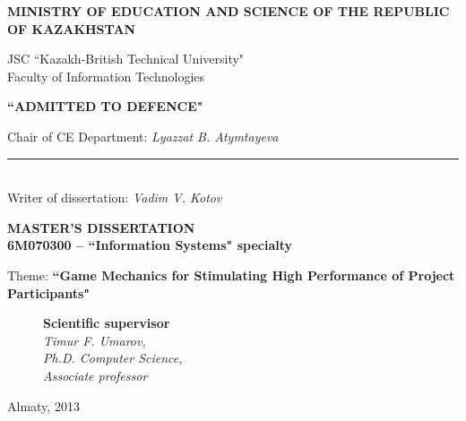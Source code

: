 \begin{titlepage}
	\pagestyle{empty}
	\begin{center}
		{\bf{\MakeUppercase{Ministry of education and science of the republic of Kazakhstan}}

		\vspace{14pt}

		JSC ``Kazakh-British Technical University"\\
		Faculty of Information Technologies}
       
       \vspace{14pt}
       
		\begin{flushright}
			{\bf \MakeUppercase{``Admitted to defence"}}

			Chair of CE Department: {\em Lyazzat B. Atymtayeva}\\
			\vspace{0.5\baselineskip}
			\rule{13em}{0.4pt}\\
			\vspace{14pt}
          Writer of dissertation: {\em Vadim V. Kotov}
          \vspace{14pt}
		\end{flushright}
		
		{\bf
		\MakeUppercase{Master's Dissertation}\\
		6M070300 -- ``Information Systems" specialty}

		\vspace{14pt}

		Theme: {\bf ``Game Mechanics for Stimulating High Performance of Project Participants"}
		
		\vspace{28pt}
		
		\begin{figure}[ht]
			\begin{minipage}[t]{0.6\linewidth}
				{\bf Scientific supervisor}\\

				{\em Timur F. Umarov,\\
				Ph.D. Computer Science,\\
				Associate professor}\\
			\end{minipage}
		\end{figure}

	\end{center}


	\begin{center}
		\vfill
		Almaty, 2013
	\end{center}


\end{titlepage}
